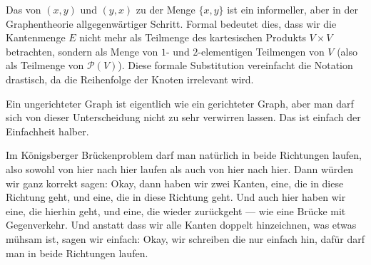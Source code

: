 \begin{math-stroke}

\begin{didactic-insight}
Das  von $(x, y)$ und $(y, x)$ zu der Menge $\{x, y\}$ ist ein informeller, aber in der Graphentheorie allgegenwärtiger Schritt. Formal bedeutet dies, dass wir die Kantenmenge $E$ nicht mehr als Teilmenge des kartesischen Produkts $V \times V$ betrachten, sondern als Menge von $1$- und $2$-elementigen Teilmengen von $V$ (also als Teilmenge von $\mathcal{P}(V)$). Diese formale Substitution vereinfacht die Notation drastisch, da die Reihenfolge der Knoten irrelevant wird.
\end{didactic-insight}
\end{math-stroke}

\begin{spoken-clean}[00:17:26 - 00:20:32]
Ein ungerichteter Graph ist eigentlich wie ein gerichteter Graph, aber man darf sich von dieser Unterscheidung nicht zu sehr verwirren lassen. Das ist einfach der Einfachheit halber.

Im Königsberger Brückenproblem darf man natürlich in beide Richtungen laufen, also sowohl von hier nach hier laufen als auch von hier nach hier. Dann würden wir ganz korrekt sagen: Okay, dann haben wir zwei Kanten, eine, die in diese Richtung geht, und eine, die in diese Richtung geht. Und auch hier haben wir eine, die hierhin geht, und eine, die wieder zurückgeht --- wie eine Brücke mit Gegenverkehr. Und anstatt dass wir alle Kanten doppelt hinzeichnen, was etwas mühsam ist, sagen wir einfach: Okay, wir schreiben die nur einfach hin, dafür darf man in beide Richtungen laufen.
\end{spoken-clean}

